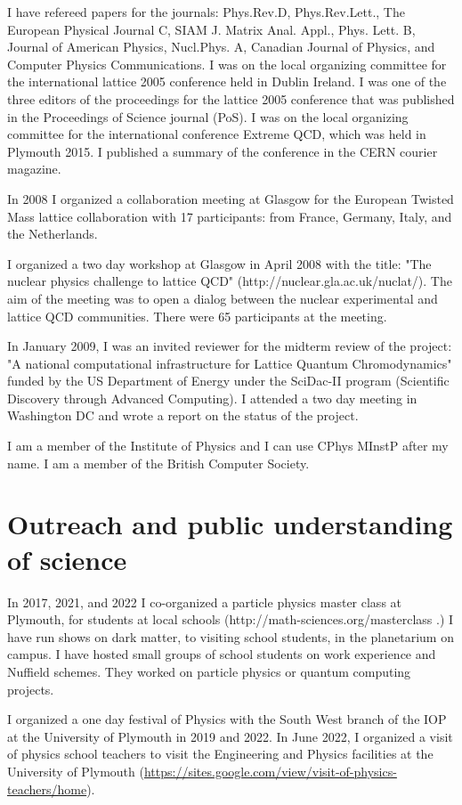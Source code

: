 \documentclass[12pt]{article}
\begin{document}
I have refereed papers for the journals: Phys.Rev.D, Phys.Rev.Lett.,
The European Physical Journal C, SIAM J. Matrix Anal. Appl.,
Phys. Lett. B, Journal of American Physics, Nucl.Phys. A, 
Canadian Journal of Physics,
and 
Computer Physics Communications.
I was on the local
organizing committee for the international lattice 2005 conference
held in Dublin Ireland. I was one of the three editors of the
proceedings for the lattice 2005 conference that was published in the
Proceedings of Science journal (PoS). I was on the local organizing
committee for the international conference Extreme QCD, which was held
in Plymouth 2015. I published a summary of the conference in the CERN 
courier magazine.

In 2008 I organized a collaboration meeting at Glasgow for the
European Twisted Mass lattice collaboration with 17 participants: from
France, Germany, Italy, and the Netherlands.

I organized a two day workshop at Glasgow in April 2008 with the
title: "The nuclear physics challenge to lattice QCD"
(http://nuclear.gla.ac.uk/nuclat/). The aim of the meeting was to
open a dialog between the nuclear experimental and lattice
QCD communities. There were 65 participants at the meeting.

In January 2009, I was an invited reviewer for the midterm review of
the project: "A national computational infrastructure for Lattice
Quantum Chromodynamics" funded by the US Department of Energy 
under the SciDac-II program (Scientific Discovery 
through Advanced Computing).
I attended a two day meeting in Washington DC and wrote a report
on the status of the project.

I am a member of the Institute of Physics and I can use
CPhys MInstP after my name. I am a member of the British Computer
Society.

\section{Outreach and public understanding of science}

In 2017, 2021, and 2022 I co-organized a particle physics master 
class at Plymouth, for students at local schools  (http://math-sciences.org/masterclass .)
I have run shows on dark matter, to visiting school students,
in the planetarium on campus. I have hosted small groups
of school students on work experience and Nuffield 
schemes. They worked on particle physics or quantum computing
projects.

I organized a one day festival of Physics with the South West branch of
the IOP at the University of Plymouth in 2019 and 2022. In June 2022,
I organized a visit of physics school teachers to visit
the Engineering and Physics facilities at the University of
Plymouth (\url{https://sites.google.com/view/visit-of-physics-teachers/home}).
\end{document}
